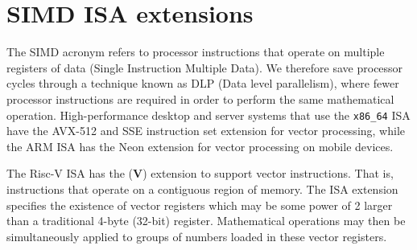\documentclass[a4paper,8pt]{report}
\begin{document}









\section{SIMD ISA extensions}
The SIMD acronym refers to processor instructions that operate on multiple
registers of data (Single Instruction Multiple Data). We therefore save
processor cycles through a technique known as DLP (Data level parallelism),
where fewer processor instructions are required in order to perform the same
mathematical operation. High-performance desktop and server systems that use the
\texttt{x86\_64} ISA have the AVX-512 and SSE instruction set extension for
vector processing, while the ARM ISA has the Neon extension for vector
processing on mobile devices.

The Risc-V ISA has the (\textbf{V}) extension to support vector instructions.
That is, instructions that operate on a contiguous region of memory. The ISA
extension specifies the existence of vector registers which may be some power of
2 larger than a traditional 4-byte (32-bit) register. Mathematical operations
may then be simultaneously applied to groups of numbers loaded in these vector
registers.
\end{document}
